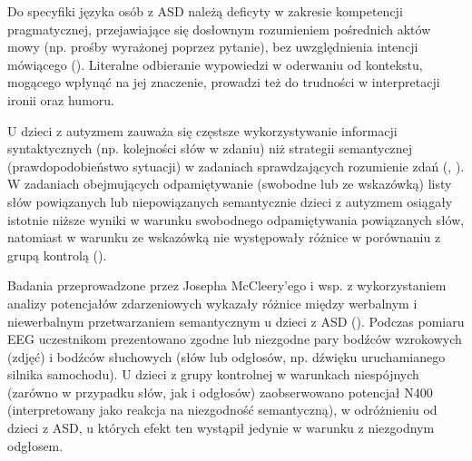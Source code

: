     Do specyfiki języka osób z ASD należą deficyty w zakresie kompetencji pragmatycznej, przejawiające się dosłownym rozumieniem pośrednich aktów mowy (np. prośby wyrażonej poprzez pytanie), bez uwzględnienia intencji mówiącego (\cite{frith2008autyzm}).
    Literalne odbieranie wypowiedzi w oderwaniu od kontekstu, mogącego wpłynąć na jej znaczenie, prowadzi też do trudności w interpretacji ironii oraz humoru.
    
    U dzieci z autyzmem zauważa się częstsze wykorzystywanie informacji syntaktycznych (np. kolejności słów w zdaniu) niż strategii semantycznej (prawdopodobieństwo sytuacji) w zadaniach sprawdzających rozumienie zdań (\cite{tager1981sentence}, \cite{paul1988brief}).
    W zadaniach obejmujących odpamiętywanie (swobodne lub ze wskazówką) listy słów powiązanych lub niepowiązanych semantycznie dzieci z autyzmem osiągały istotnie niższe wyniki w warunku swobodnego odpamiętywania powiązanych słów, natomiast w warunku ze wskazówką nie występowały różnice w porównaniu z grupą kontrolą (\cite{tager1991semantic}).
    
    Badania przeprowadzone przez Josepha McCleery'ego i wsp. z wykorzystaniem analizy potencjałów zdarzeniowych wykazały różnice między werbalnym i niewerbalnym przetwarzaniem semantycznym u dzieci z ASD (\cite{mccleery2010neural}).
    Podczas pomiaru EEG uczestnikom prezentowano zgodne lub niezgodne pary bodźców wzrokowych (zdjęć) i bodźców słuchowych (słów lub odgłosów, np. dźwięku uruchamianego silnika samochodu).
    U dzieci z grupy kontrolnej w warunkach niespójnych (zarówno w przypadku słów, jak i odgłosów) zaobserwowano potencjał N400 (interpretowany jako reakcja na niezgodność semantyczną), w odróżnieniu od dzieci z ASD, u których efekt ten wystąpił jedynie w warunku z niezgodnym odgłosem.
    
    

